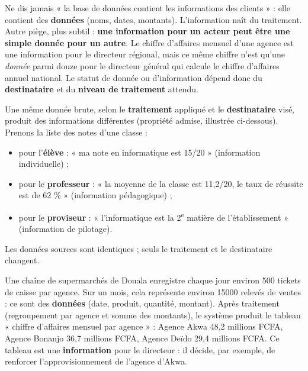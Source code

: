 \documentclass[11pt]{article}
\begin{document}
\begin{attention}
Ne dis jamais « la base de données contient les informations des clients » : elle contient des \textbf{données} (noms, dates, montants). L'information naît du traitement. Autre piège, plus subtil : \textbf{une information pour un acteur peut être une simple donnée pour un autre}. Le chiffre d'affaires mensuel d'une agence est une information pour le directeur régional, mais ce même chiffre n'est qu'une \emph{donnée} parmi douze pour le directeur général qui calcule le chiffre d'affaires annuel national. Le statut de donnée ou d'information dépend donc du \textbf{destinataire} et du \textbf{niveau de traitement} attendu.
\end{attention}

\begin{propriete}
Une même donnée brute, selon le \textbf{traitement} appliqué et le \textbf{destinataire} visé, produit des informations différentes (propriété admise, illustrée ci-dessous). Prenons la liste des notes d'une classe :
\begin{itemize}
\item pour l'\textbf{élève} : « ma note en informatique est 15/20 » (information individuelle) ;
\item pour le \textbf{professeur} : « la moyenne de la classe est 11,2/20, le taux de réussite est de 62 \% » (information pédagogique) ;
\item pour le \textbf{proviseur} : « l'informatique est la 2\textsuperscript{e} matière de l'établissement » (information de pilotage).
\end{itemize}
Les données sources sont identiques ; seuls le traitement et le destinataire changent.
\end{propriete}

\begin{exemplebox}
Une chaîne de supermarchés de Douala enregistre chaque jour environ 500 tickets de caisse par agence. Sur un mois, cela représente environ \num{15000} relevés de ventes : ce sont des \textbf{données} (date, produit, quantité, montant). Après traitement (regroupement par agence et somme des montants), le système produit le tableau « chiffre d'affaires mensuel par agence » : Agence Akwa 48,2 millions FCFA, Agence Bonanjo 36,7 millions FCFA, Agence Deïdo 29,4 millions FCFA. Ce tableau est une \textbf{information} pour le directeur : il décide, par exemple, de renforcer l'approvisionnement de l'agence d'Akwa.
\end{exemplebox}
\end{document}
